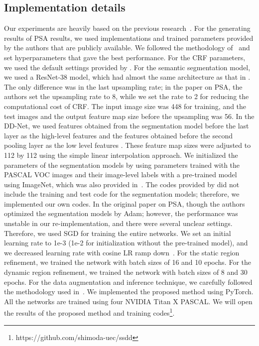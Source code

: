 \documentclass[10pt,twocolumn,letterpaper]{article}
\begin{document}
\subsection{Implementation details}
Our experiments are heavily based on the previous research~\cite{psa}.
For the generating results of PSA results, we used implementations and trained parameters
provided by the authors that are publicly available.
We followed the methodology of~\cite{psa} and set hyperparameters
that gave the best performance.
For the CRF parameters, we used the default settings provided by \cite{kra11}.
For the semantic segmentation model, we used a ResNet-38 model, which had almost the same architecture as that in \cite{psa}.
The only difference was in the last upsampling rate; in the paper on PSA, the authors set the upsampling rate to 8, while we set the rate to 2 for reducing the computational cost of CRF.
The input image size was 448 for training, and the test images and the output feature map size before the upsampling was 56.
In the DD-Net, we used features obtained from the segmentation model before the last layer as the high-level features  and the features obtained before the second pooling layer 
as the low level features . 
These feature map sizes were adjusted to 112 by 112 using the simple linear interpolation approach.
We initialized the parameters of the segmentation models by using parameters trained with the PASCAL VOC images and their image-level labels with a pre-trained model using ImageNet, which was also provided in~\cite{psa}.
The codes provided by \cite{psa} did not include the training and test code for the segmentation models; therefore, we implemented our own codes.
In the original paper on PSA, though the authors optimized the segmentation models by Adam; however,
the performance was unstable in our re-implementation, and there were several unclear settings. 
Therefore, we used SGD for training the entire networks.
We set an initial learning rate to 1e-3 (1e-2 for initialization without the pre-trained model), and
we decreased learning rate with cosine LR ramp down~\cite{cosign_warm}.
For the static region refinement, we trained the network with batch sizes of 16 and 10 epochs.
For the dynamic region refinement, we trained the network with batch sizes of 8 and 30 epochs.
For the data augmentation and inference technique, we carefully followed the methodology used in~\cite{psa}.
We implemented the proposed method using PyTorch.
All the networks are trained using four NVIDIA Titan X PASCAL.
We will open the results of the proposed method and training codes\footnote{https://github.com/shimoda-uec/ssdd}.
\end{document}
